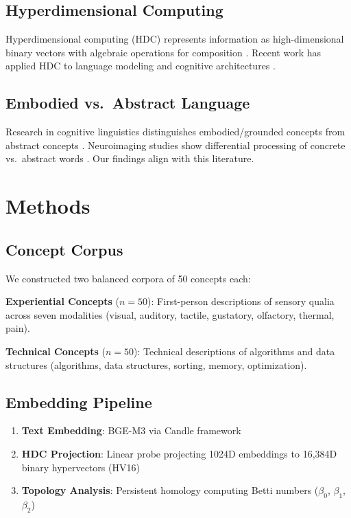 \documentclass[11pt,a4paper]{article}
\begin{document}
\subsection{Hyperdimensional Computing}

Hyperdimensional computing (HDC) represents information as high-dimensional binary vectors with algebraic operations for composition \citep{kanerva2009hyperdimensional}. Recent work has applied HDC to language modeling \citep{rahimi2016robust} and cognitive architectures \citep{gayler2003vector}.

\subsection{Embodied vs.\ Abstract Language}

Research in cognitive linguistics distinguishes embodied/grounded concepts from abstract concepts \citep{barsalou2008grounded, lakoff1980metaphors}. Neuroimaging studies show differential processing of concrete vs.\ abstract words \citep{wang2010neural}. Our findings align with this literature.

\section{Methods}

\subsection{Concept Corpus}

We constructed two balanced corpora of 50 concepts each:

\textbf{Experiential Concepts} ($n=50$): First-person descriptions of sensory qualia across seven modalities (visual, auditory, tactile, gustatory, olfactory, thermal, pain).

\textbf{Technical Concepts} ($n=50$): Technical descriptions of algorithms and data structures (algorithms, data structures, sorting, memory, optimization).

\subsection{Embedding Pipeline}

\begin{enumerate}
    \item \textbf{Text Embedding}: BGE-M3 via Candle framework
    \item \textbf{HDC Projection}: Linear probe projecting 1024D embeddings to 16,384D binary hypervectors (HV16)
    \item \textbf{Topology Analysis}: Persistent homology computing Betti numbers ($\beta_0$, $\beta_1$, $\beta_2$)
\end{enumerate}
\end{document}
